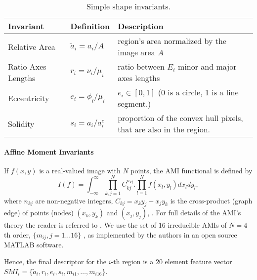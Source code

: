 \documentclass[a4paper,11pt]{article}
\begin{document}
\begin{table}[!ht]
\begin{center}
\begin{tabular}{|l||l|l|}
\hline
Invariant & Definition & Description\\
\hline
\hline
Relative Area & $\tilde{a}_i = {a_i}/{A}$ & region's area normalized by the image area $A$\\
\hline
Ratio Axes Lengths & $r_i = {\nu_i}/{\mu_i}$& ratio between $E_i$ minor and major axes lengths\\
\hline
Eccentricity &$e_i = \phi_i/\mu_i$& $e_i \in [0,1]$ (0 is a circle, 1 is a line segment.)\\
\hline
Solidity & $s_i = {a_i}/{a_i^c} $ & proportion of the convex hull pixels, that are also in the region. \\
\hline
\end{tabular}
\end{center}
\vspace{-20pt}
\caption{\small Simple shape invariants.} \label{tab:ssi}
  \vspace{-20pt}
\end{table}

\paragraph{Affine Moment Invariants}
 
If $f(x,y)$ is a real-valued image with $N$ points, the AMI functional is defined by
\begin{equation}
I(f) = \int_{-\infty}^{\infty} \prod_{k,j=1}^{N}C_{kj}^{n_{kj}} . \prod_{l=1}^{N}f(x_l, y_l)dx_ldy_l,
\end{equation}
where $n_{kj}$ are non-negative integers, $C_{kj} =x_ky_j - x_jy_k$ is the cross-product (graph edge) of points (nodes) $(x_k, y_k)$ and $(x_j, y_j)$, \cite{SukF04}. For full details of the AMI's theory the reader is referred to \cite{Flusser09a}.
We use the set of $16$ irreducible AMIs of $N=4$th order, $\{m_{ij},j=1 \ldots 16 \}$ , as implemented by the authors in an open source MATLAB software.%

Hence, the final descriptor for the $i$-th region is a $20$ element feature vector $SMI_i = \{\tilde{a}_i, r_i, e_i, s_i, m_{i1}, \ldots, m_{i16}\}$. 
\end{document}
